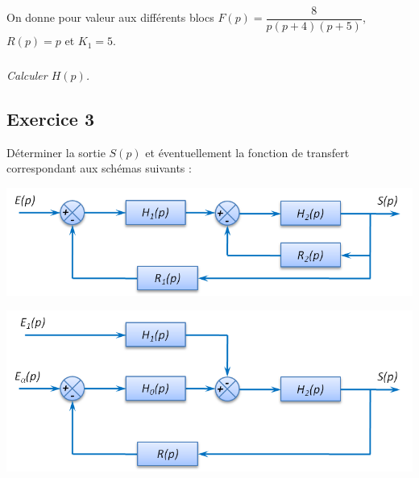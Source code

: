\documentclass[11pt,oneside]{article}
\begin{document}
On donne pour valeur aux différents blocs $F(p)=\dfrac{8}{p\left(p+4 \right)\left( p+5\right)}$, $R(p)=p$ et $K_1 = 5$.

\subparagraph{}
\textit{Calculer $H(p)$.}


\subsection*{Exercice 3}
\setcounter{subparagraph}{0}

Déterminer la sortie $S(p)$ et éventuellement la fonction de transfert correspondant aux schémas suivants : 

\begin{center}
\includegraphics[width=.6\textwidth]{png/fig_04}
\end{center}


\begin{center}
\includegraphics[width=.6\textwidth]{png/fig_05}
\end{center}
\end{document}
